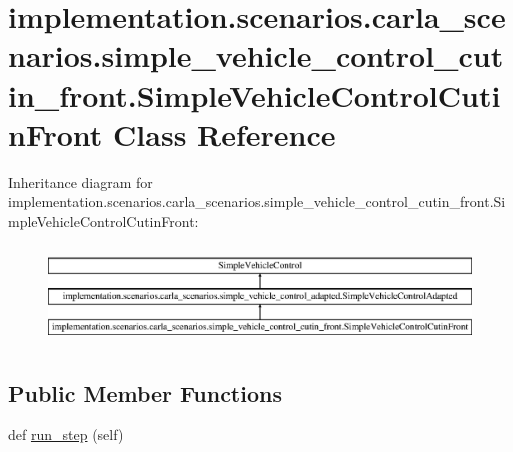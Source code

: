 \hypertarget{classimplementation_1_1scenarios_1_1carla__scenarios_1_1simple__vehicle__control__cutin__front_14eb2b3a85937f52b63b15ef53e9a1f6e}{}\section{implementation.\+scenarios.\+carla\+\_\+scenarios.\+simple\+\_\+vehicle\+\_\+control\+\_\+cutin\+\_\+front.\+Simple\+Vehicle\+Control\+Cutin\+Front Class Reference}
\label{classimplementation_1_1scenarios_1_1carla__scenarios_1_1simple__vehicle__control__cutin__front_14eb2b3a85937f52b63b15ef53e9a1f6e}
Inheritance diagram for implementation.\+scenarios.\+carla\+\_\+scenarios.\+simple\+\_\+vehicle\+\_\+control\+\_\+cutin\+\_\+front.\+Simple\+Vehicle\+Control\+Cutin\+Front\+:\begin{figure}[H]
\begin{center}
\leavevmode
\includegraphics[height=2.625000cm]{classimplementation_1_1scenarios_1_1carla__scenarios_1_1simple__vehicle__control__cutin__front_14eb2b3a85937f52b63b15ef53e9a1f6e}
\end{center}
\end{figure}
\subsection*{Public Member Functions}
\begin{DoxyCompactItemize}
\item 
def \hyperlink{classimplementation_1_1scenarios_1_1carla__scenarios_1_1simple__vehicle__control__cutin__front_14eb2b3a85937f52b63b15ef53e9a1f6e_ac87a8a7af06b9d3990992088a9a56e51}{run\+\_\+step} (self)
\end{DoxyCompactItemize}


